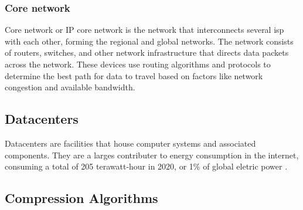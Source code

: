 \subsubsection{Core network}

Core network or IP core network is the network that interconnects several \ac{isp} with each other, forming the regional and global networks.
The network consists of routers, switches, and other network infrastructure that directs data packets across the network. These devices use routing algorithms and protocols to determine the best path for data to travel based on factors like network congestion and available bandwidth.

\subsection{Datacenters}

Datacenters are facilities that house computer systems and associated components. They are a larges contributer to energy consumption in the internet, consuming a total of 205 \ac{terawatt-hour} in 2020, or 1\% of global eletric power \citet{IEA2020}. 


\subsection{Compression Algorithms}